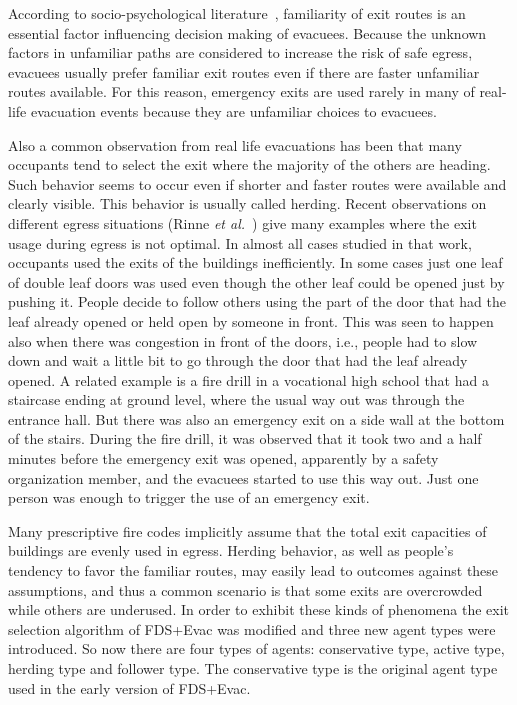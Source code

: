 \documentclass[12pt,a4paper,final,twoside]{stylevk}
\begin{document}
\noindent According to socio-psychological
literature~\cite{Pan06,Proulx1993}, familiarity of exit routes is
an essential factor influencing decision making of evacuees.  Because the
unknown factors in unfamiliar paths are considered to increase the risk of safe egress, 
evacuees usually prefer familiar exit routes even if there are faster unfamiliar routes available. 
For this reason, emergency exits are used rarely in many of real-life evacuation 
events because they are unfamiliar choices to evacuees.  


Also a common observation from real life evacuations has been that
many occupants tend to select the exit where the majority of the
others are heading.  Such behavior seems to occur even if shorter and
faster routes were available and clearly visible. This behavior is
usually called herding. Recent observations on different egress
situations (Rinne \emph{et al.}~\cite{Rinne10}) give many examples
where the exit usage during egress is not optimal.  In almost all
cases studied in that work, occupants used the exits of the buildings
inefficiently.  In some cases just one leaf of double leaf doors was
used even though the other leaf could be opened just by pushing it.
People decide to follow others using the part of the door that had the
leaf already opened or held open by someone in front.  This was seen
to happen also when there was congestion in front of the doors, i.e.,
people had to slow down and wait a little bit to go through the door
that had the leaf already opened.  A related example is a fire drill
in a vocational high school that had a staircase ending at ground
level, where the usual way out was through the entrance hall.  But
there was also an emergency exit on a side wall at the bottom of the
stairs.  During the fire drill, it was observed that it took two and a
half minutes before the emergency exit was opened, apparently by a
safety organization member, and the evacuees started to use this way
out.  Just one person was enough to trigger the use of an emergency
exit.


Many prescriptive fire codes implicitly assume that the total exit 
capacities of buildings are evenly used in egress.  Herding behavior, 
as well as people's tendency to favor the familiar routes, may easily lead to
outcomes against these assumptions, and thus a common scenario is that some exits are overcrowded while others are underused.  In order to exhibit these kinds of phenomena the exit selection algorithm of FDS+Evac was modified and three new agent types were introduced.  So now there are four types of agents: conservative type, active type, herding type and follower type.  The conservative type is the original agent type used in the early version of FDS+Evac.  
\end{document}
